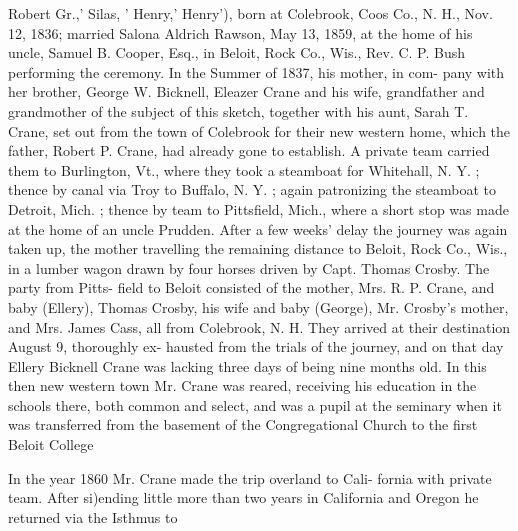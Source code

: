 \documentclass[oneside]{book}
\begin{document}
Robert Gr.,' Silas, ' Henry,' Henry'), born at Colebrook, Coos 
Co., N. H., Nov. 12, 1836; married Salona Aldrich Rawson, 
May 13, 1859, at the home of his uncle, Samuel B. Cooper, 
Esq., in Beloit, Rock Co., Wis., Rev. C. P. Bush performing 
the ceremony. In the Summer of 1837, his mother, in com- 
pany with her brother, George W. Bicknell, Eleazer Crane and 
his wife, grandfather and grandmother of the subject of this 
sketch, together with his aunt, Sarah T. Crane, set out from the 
town of Colebrook for their new western home, which the father, 
Robert P. Crane, had already gone to establish. A private team 
carried them to Burlington, Vt., where they took a steamboat for 
Whitehall, N. Y. ; thence by canal via Troy to Buffalo, N. Y. ; 
again patronizing the steamboat to Detroit, Mich. ; thence by 
team to Pittsfield, Mich., where a short stop was made at the 
home of an uncle Prudden. After a few weeks' delay the journey 
was again taken up, the mother travelling the remaining distance 
to Beloit, Rock Co., Wis., in a lumber wagon drawn by four 
horses driven by Capt. Thomas Crosby. The party from Pitts- 
field to Beloit consisted of the mother, Mrs. R. P. Crane, and 
baby (Ellery), Thomas Crosby, his wife and baby (George), Mr. 
Crosby's mother, and Mrs. James Cass, all from Colebrook, N. 
H. They arrived at their destination August 9, thoroughly ex- 
hausted from the trials of the journey, and on that day Ellery 
Bicknell Crane was lacking three days of being nine months old. 
In this then new western town Mr. Crane was reared, receiving 
his education in the schools there, both common and select, and 
was a pupil at the seminary when it was transferred from the 
basement of the Congregational Church to the first Beloit College 

In the year 1860 Mr. Crane made the trip overland to Cali- 
fornia with private team. After si)ending little more than two 
years in California and Oregon he returned via the Isthmus to 
\end{document}

